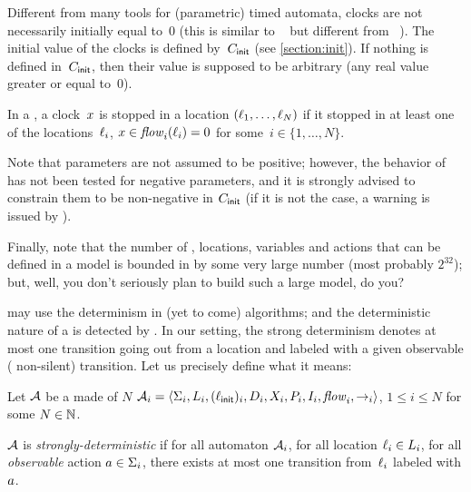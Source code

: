 Different from many tools for (parametric) timed automata, clocks are not necessarily initially equal to~0 (this is similar to \hytech{}~\cite{HHW95} but different from \uppaal{}~\cite{LPY97}).
The initial value of the clocks is defined by~$C_{\textsf{init}}$ (see \cref{section:init}).
If nothing is defined in~$C_{\textsf{init}}$, then their value is supposed to be arbitrary (any real value greater or equal to~0).


In a \NIPTA{}, a clock~$x$ is stopped in a location $(\ell_1, \dots, \ell_N)$ if it stopped in at least one of the locations~$\ell_i$, \ie{} $x \in \mathit{flow}_i(\ell_i) = 0$ for some~$i \in \{ 1 , \dots , N \}$.

Note that parameters are not assumed to be positive; however, the behavior of \imitator{} has not been tested for negative parameters, and it is strongly advised to constrain them to be non-negative in $C_{\textsf{init}}$ (if it is not the case, a warning is issued by \imitator{}).


Finally, note that the number of \IPTA{}, locations, variables and actions that can be defined in a model is bounded in \imitator{} by some very large number (most probably $2^{32}$); but, well, you don't seriously plan to build such a large model, do you?

\bigskip

\imitator{} may use the determinism in (yet to come) algorithms; and the deterministic nature of a \NIPTA{} is detected by \imitator{}.
In our setting, the strong determinism denotes at most one transition going out from a location and labeled with a given observable (\ie{} non-silent) transition.
Let us precisely define what it means:

\begin{definition}
	Let $\mathcal{A}$ be a \NIPTA{} made of $N$ \IPTA{} $\mathcal{A}_i = \langle\Sigma_i, L_i, (\ell_{\textsf{init}})_i, D_i, X_i, P_i, I_i, \mathit{flow}_i, {\rightarrow}_i\rangle$, $1 \leq i \leq N$ for some $N \in {\mathbb N}$.

	$\mathcal{A}$ is \emph{strongly-deterministic} if
	for all automaton $\mathcal{A}_i$,
	for all location $\ell_i \in L_i$,
	for all \emph{observable} action $a \in \Sigma_i$,
	there exists at most one transition from~$\ell_i$ labeled with $a$.
\end{definition}




